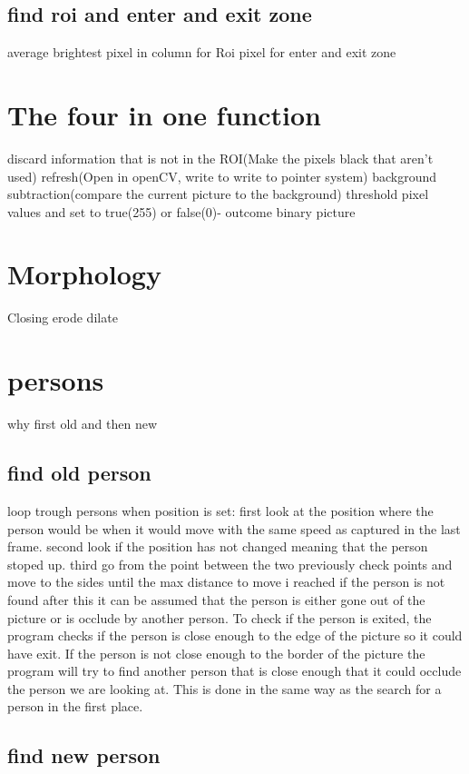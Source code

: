 \subsection{find roi and enter and exit zone}
average brightest pixel in column for Roi
pixel for enter and exit zone

\section{The four in one function}
discard information that is not in the ROI(Make the pixels black that aren't used)
refresh(Open in openCV, write to write to pointer system)
background subtraction(compare the current picture to the background)
threshold pixel values and set to true(255) or false(0)- outcome binary picture

\section{Morphology}
Closing
	erode
	dilate
	
\section{persons}
why first old and then new
\subsection{find old person}
loop trough persons
when position is set:
	first look at the position where the person would be when it would move with the same speed as captured in the last frame.
	second look if the position has not changed meaning that the person stoped up.
	third go from the point between the two previously check points and move to the sides until the max distance to move i reached
	if the person is not found after this it can be assumed that the person is either gone out of the picture or is occlude by another person. To check if the person is exited, the program checks if the person is close enough to the edge of the picture so it could have exit. If the person is not close enough to the border of the  picture the program will try to find another person that is close enough that it could occlude the person we are looking at.  This is done in the same way as the search for a person in the first place.
	
\subsection{find new person}

